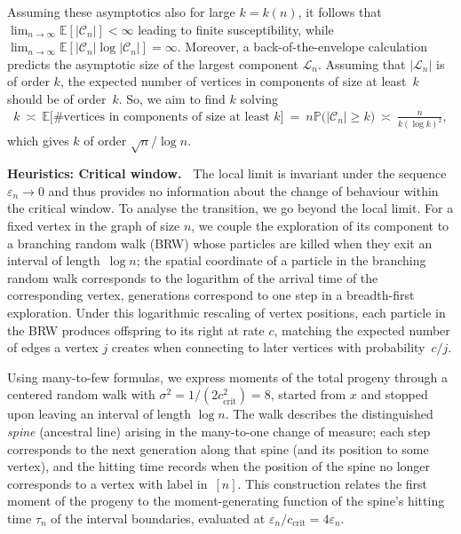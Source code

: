 \documentclass[a4paper, a4wide, 10pt, reqno]{amsart}
\theoremstyle{plain}
\theoremstyle{definition}
\numberwithin{equation}{section}
\newcommand{\E}{\mathbb E}
\newcommand{\Prob}{\mathbb{P}}
\newcommand{\sC}{{\mathscr C}}
\newcommand{\sL}{{\mathscr L}}
\begin{document}
\smallskip 
Assuming these asymptotics also for large $k=k(n)$, it follows that $\lim_{n\to\infty}\E[|\sC_n|]<\infty$ leading to finite susceptibility, while $\lim_{n\to\infty}\E[|\sC_n|\log |\sC_n|]=\infty$. Moreover, a back-of-the-envelope calculation predicts the asymptotic size of the largest component $\sL_n$. Assuming that $|\sL_n|$ is of order $k$, the expected number of vertices in components of size at least~$k$ should be of order~$k$. So, we aim to find $k$ solving
\[
\begin{aligned}
k\ \asymp\ \E\big[\#\text{vertices in components of size at least $k$}\big]\ = \ n \Prob\big(|\sC_n|\ge k\big) \ \asymp \ \frac{n}{k (\log k)^2},
\end{aligned}
\]
which gives $k$ of order $\sqrt{n}/\log n$. 

\pagebreak[3]

\medskip
\noindent\textbf{Heuristics: Critical window.\ }
The local limit is invariant under the sequence $\varepsilon_n\to0$ and thus provides no information about the change of behaviour within the critical window. To analyse the transition, we go beyond the local limit. For a fixed vertex in the graph of size $n$, we couple the exploration of its component to a branching random walk  (BRW) whose particles are killed when they exit an interval of length~$\log n$; the spatial coordinate 
of a particle in the branching random walk
corresponds to the logarithm of the arrival time of the corresponding vertex, generations correspond to one step in a breadth-first exploration. Under this logarithmic rescaling of vertex positions, each particle in the BRW produces offspring to its right at rate $c$, matching the expected number of edges a vertex $j$ creates when connecting to later vertices with probability~$c/j$.

\smallskip
Using many-to-few formulas, we express moments of the total progeny through a  centered random walk with  $\sigma^2=1/(2c_\mathrm{crit}^2)=8$, started from $x$ and
stopped upon leaving an interval of length $\log n$. The walk describes the distinguished \emph{spine} (ancestral line) arising in the many-to-one change of measure; each step corresponds to the next generation along that spine (and its position to some vertex), and the hitting time records when the position of the spine no longer corresponds to a vertex with label in~$[n]$. This construction relates the first moment of the progeny to the moment-generating function of the spine's hitting time $\tau_n$ of the interval boundaries, evaluated at $\varepsilon_n/c_\mathrm{crit}=4\varepsilon_n$. 
\end{document}
